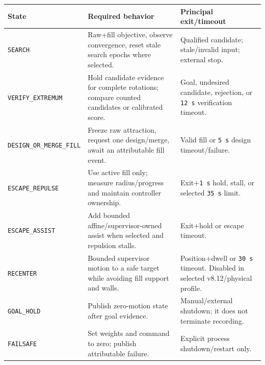 \documentclass[
  10pt,
  letterpaper,
]{article}
\newcounter{none} %
\begin{document}
{\def\LTcaptype{none} %
\begin{longtable}[]{@{}
  >{\raggedright\arraybackslash}p{}
  >{\raggedright\arraybackslash}p{}
  >{\raggedright\arraybackslash}p{}@{}}
\toprule\noalign{}
\begin{minipage}[b]{\linewidth}\raggedright
State
\end{minipage} & \begin{minipage}[b]{\linewidth}\raggedright
Required behavior
\end{minipage} & \begin{minipage}[b]{\linewidth}\raggedright
Principal exit/timeout
\end{minipage} \\
\midrule\noalign{}
\endhead
\bottomrule\noalign{}
\endlastfoot
\nolinkurl{SEARCH} & Raw+fill objective, observe convergence, reset stale search epochs where selected. & Qualified candidate; stale/invalid input; external stop. \\
\nolinkurl{VERIFY\_EXTREMUM} & Hold candidate evidence for complete rotations; compare counted candidates or calibrated score. & Goal, undesired candidate, rejection, or \texttt{12 s} verification timeout. \\
\nolinkurl{DESIGN\_OR\_MERGE\_FILL} & Freeze raw attraction, request one design/merge, await an attributable fill event. & Valid fill or \texttt{5 s} design timeout/failure. \\
\nolinkurl{ESCAPE\_REPULSE} & Use active fill only; measure radius/progress and maintain controller ownership. & Exit+\texttt{1 s} hold, stall, or selected \texttt{35 s} limit. \\
\nolinkurl{ESCAPE\_ASSIST} & Add bounded affine/supervisor-owned assist when selected and repulsion stalls. & Exit+hold or escape timeout. \\
\nolinkurl{RECENTER} & Bounded supervisor motion to a safe target while avoiding fill support and walls. & Position+dwell or \texttt{30 s} timeout. Disabled in selected v8.12/physical profile. \\
\nolinkurl{GOAL\_HOLD} & Publish zero-motion state after goal evidence. & Manual/external shutdown; it does not terminate recording. \\
\nolinkurl{FAILSAFE} & Set weights and command to zero; publish attributable failure. & Explicit process shutdown/restart only. \\
\end{longtable}
}
\end{document}
